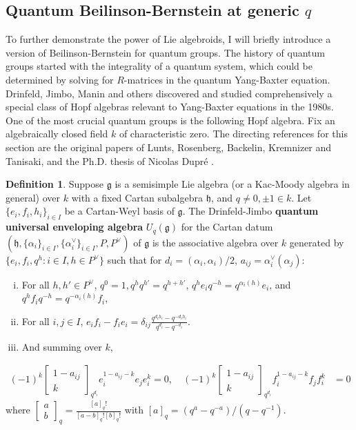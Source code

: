 \documentclass[11pt, a4paper]{article}
\theoremstyle{definition}
\newtheorem{definition}[theorem]{Definition}
\newcommand{\h}{\mathfrak h}
\newcommand{\g}{\mathfrak g}
\begin{document}
    \subsection{Quantum Beilinson-Bernstein at generic \texorpdfstring{$q$}{}}
    To further demonstrate the power of Lie algebroids, I will briefly introduce a version of Beilinson-Bernstein for quantum groups. The history of quantum groups started with the integrality of a quantum system, which could be determined by solving for $R$-matrices in the quantum Yang-Baxter equation. Drinfeld, Jimbo, Manin and others discovered and studied comprehensively a special class of Hopf algebras relevant to Yang-Baxter equations in the 1980s. One of the most crucial quantum groups is the following Hopf algebra. Fix an algebraically closed field $k$ of characteristic zero. The directing references for this section are the original papers \cite{MR1694897,backelin-quantum,tanisaki-quantum} of Lunts, Rosenberg, Backelin, Kremnizer and Tanisaki, and the Ph.D. thesis of Nicolas Dupré \cite{dupre-phd}.
    \begin{definition}
        Suppose $\g$ is a semisimple Lie algebra (or a Kac-Moody algebra in general) over $k$ with a fixed Cartan subalgebra $\h$, and $q\neq 0,\pm 1\in k$. Let $\{e_i, f_i, h_i\}_{i\in I}$ be a Cartan-Weyl basis of $\g$. The Drinfeld-Jimbo \textbf{quantum universal enveloping algebra} $U_q(\g)$ for the Cartan datum $(\mathfrak h, \{\alpha_i\}_{i\in I}, \{\alpha_i^\vee\}_{i\in I}, P, P^\vee)$ of $\g$ is the associative algebra over $k$ generated by $\{e_i, f_i, q^{h} : i\in I, h\in P^\vee\}$ such that for $d_i=(\alpha_i,\alpha_i)/2$, $a_{ij}=\alpha_i^\vee(\alpha_j)$:
        \begin{enumerate}[(i)]
            \item For all $h, h'\in P^\vee$, $q^0 = 1, q^hq^{h'}=q^{h+h'}$, $q^he_iq^{-h} = q^{\alpha_i(h)}e_i$, and $q^hf_iq^{-h} = q^{-\alpha_i(h)}f_i$,
            \item For all $i, j\in I$, $e_if_i-f_ie_i = \delta_{ij}\frac{q^{d_ih_i}-q^{-d_ih_i}}{q^{d_i}-q^{-d_i}}$.
            \item And summing over $k$,
        \end{enumerate}
        \begin{align*}
            (-1)^k\left[\begin{smallmatrix} 1-a_{ij} \\ k \end{smallmatrix}\right]_{q^{d_i}}e_i^{1-a_{ij}-k}e_je_i^k=0, \quad (-1)^k\left[\begin{smallmatrix} 1-a_{ij} \\ k \end{smallmatrix}\right]_{q^{d_i}}f_i^{1-a_{ij}-k}f_jf_i^k&=0
        \end{align*}
        where $\left[\begin{smallmatrix} a \\ b \end{smallmatrix}\right]_{q}=\frac{[a]_q!}{[a-b]_q![b]_q!}$ with $[a]_q=(q^a-q^{-a})/(q-q^{-1})$.
    \end{definition}
\end{document}
